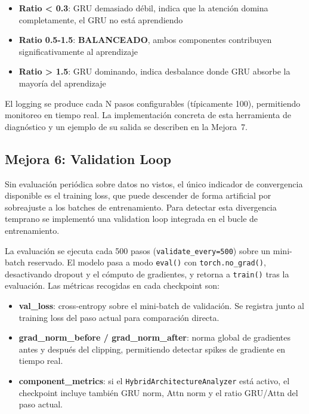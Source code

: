 \begin{itemize}
    \item \textbf{Ratio < 0.3}: GRU demasiado débil, indica que la atención domina completamente, el GRU no está aprendiendo
    \item \textbf{Ratio 0.5-1.5}: \textbf{BALANCEADO}, ambos componentes contribuyen significativamente al aprendizaje
    \item \textbf{Ratio > 1.5}: GRU dominando, indica desbalance donde GRU absorbe la mayoría del aprendizaje
\end{itemize}

El logging se produce cada N pasos configurables (típicamente 100), permitiendo monitoreo en tiempo real. La implementación concreta de esta herramienta de diagnóstico y un ejemplo de su salida se describen en la Mejora~7.

\subsection{Mejora 6: Validation Loop}

Sin evaluación periódica sobre datos no vistos, el único indicador de convergencia disponible es el training loss, que puede descender de forma artificial por sobreajuste a los batches de entrenamiento. Para detectar esta divergencia temprano se implementó una validation loop integrada en el bucle de entrenamiento.

La evaluación se ejecuta cada 500 pasos (\texttt{validate\_every=500}) sobre un mini-batch reservado. El modelo pasa a modo \texttt{eval()} con \texttt{torch.no\_grad()}, desactivando dropout y el cómputo de gradientes, y retorna a \texttt{train()} tras la evaluación. Las métricas recogidas en cada checkpoint son:

\begin{itemize}
    \item \textbf{val\_loss}: cross-entropy sobre el mini-batch de validación. Se registra junto al training loss del paso actual para comparación directa.
    \item \textbf{grad\_norm\_before / grad\_norm\_after}: norma global de gradientes antes y después del clipping, permitiendo detectar spikes de gradiente en tiempo real.
    \item \textbf{component\_metrics}: si el \texttt{HybridArchitectureAnalyzer} está activo, el checkpoint incluye también GRU norm, Attn norm y el ratio GRU/Attn del paso actual.
\end{itemize}

